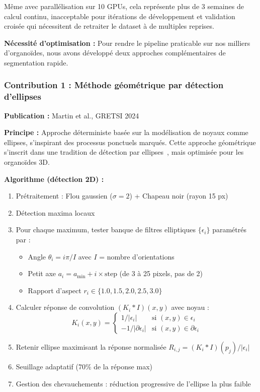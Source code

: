 Même avec parallélisation sur 10 GPUs, cela représente plus de 3 semaines de calcul continu, inacceptable pour itérations de développement et validation croisée qui nécessitent de retraiter le dataset à de multiples reprises.

\textbf{Nécessité d'optimisation :}
Pour rendre le pipeline praticable sur nos milliers d'organoïdes, nous avons développé deux approches complémentaires de segmentation rapide.

\subsubsection{Contribution 1 : Méthode géométrique par détection d'ellipses}

\textbf{Publication :} Martin et al., GRETSI 2024~\cite{Martin2024GRETSI}

\textbf{Principe :}
Approche déterministe basée sur la modélisation de noyaux comme ellipses, s'inspirant des processus ponctuels marqués. Cette approche géométrique s'inscrit dans une tradition de détection par ellipses~\cite{Kirsten2023}, mais optimisée pour les organoïdes 3D.

\textbf{Algorithme (détection 2D) :}
\begin{enumerate}
    \item Prétraitement : Flou gaussien ($\sigma=2$) + Chapeau noir (rayon 15 px)
    \item Détection maxima locaux
    \item Pour chaque maximum, tester banque de filtres elliptiques $\{\epsilon_i\}$ paramétrés par :
        \begin{itemize}
            \item Angle $\theta_i = i\pi / I$ avec $I$ = nombre d'orientations
            \item Petit axe $a_i = a_{\min} + i \times \text{step}$ (de 3 à 25 pixels, pas de 2)
            \item Rapport d'aspect $r_i \in \{1.0, 1.5, 2.0, 2.5, 3.0\}$
        \end{itemize}
    \item Calculer réponse de convolution $(K_i * I)(x, y)$ avec noyau :
        \[
        K_i(x, y) = \begin{cases}
            1/|\epsilon_i| & \text{si } (x, y) \in \epsilon_i \\
            -1/|\partial \epsilon_i| & \text{si } (x, y) \in \partial \epsilon_i
        \end{cases}
        \]
    \item Retenir ellipse maximisant la réponse normalisée $R_{i,j} = (K_i * I)(p_j) / |\epsilon_i|$
    \item Seuillage adaptatif (70\% de la réponse max)
    \item Gestion des chevauchements : réduction progressive de l'ellipse la plus faible
\end{enumerate}

